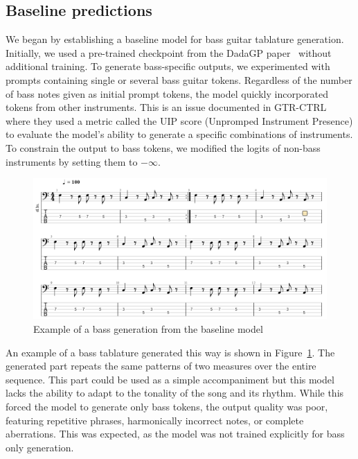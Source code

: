 \subsection{Baseline predictions}

We began by establishing a baseline model for bass guitar tablature generation.
Initially, we used a pre-trained checkpoint from the DadaGP paper~\cite{sarmento_dadagp_2021} without additional training.
To generate bass-specific outputs, we experimented with prompts containing single or several bass guitar tokens.
Regardless of the number of bass notes given as initial prompt tokens, the model quickly incorporated tokens from other instruments.
This is an issue documented in GTR-CTRL~\cite{sarmento_gtr-ctrl_2023} where they used a metric called the UIP score (Unpromped Instrument Presence) to evaluate the model's ability to generate a specific combinations of instruments.
To constrain the output to bass tokens, we modified the logits of non-bass instruments by setting them to $-\infty$.

\begin{figure}[!ht]
    \centering
    \includegraphics[width=.8\linewidth]{../images-figures/generated_bass_baseline.png}
    \caption{Example of a bass generation from the baseline model}
    \label{fig:repetitive_generation}
\end{figure}

An example of a bass tablature generated this way is shown in Figure~\ref{fig:repetitive_generation}.
The generated part repeats the same patterns of two measures over the entire sequence.
This part could be used as a simple accompaniment but this model lacks the ability to adapt to the tonality of the song and its rhythm.
While this forced the model to generate only bass tokens, the output quality was poor, featuring repetitive phrases, harmonically incorrect notes, or complete aberrations.
This was expected, as the model was not trained explicitly for bass only generation. 

